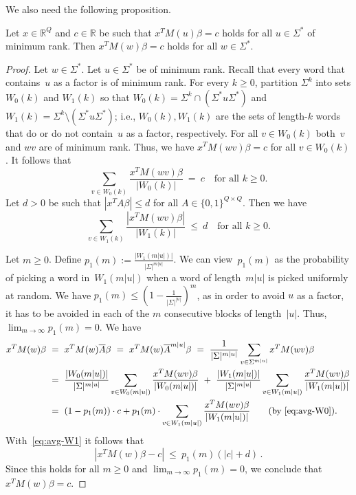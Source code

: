 \noindent
We also need the following proposition.

\begin{prop}\label{prop:compact}
Let $x \in \mathbb{R}^{Q}$ and $c \in \mathbb{R}$ be such that $x^T M(u) \beta = c$ holds for all $u \in \Sigma^*$ of minimum rank.
Then $x^T M(w) \beta = c$ holds for all $w \in \Sigma^*$.
\end{prop}

\begin{proof}
Let $w \in \Sigma^*$.
Let $u \in \Sigma^*$ be of minimum rank.
Recall that every word that contains~$u$ as a factor is of minimum rank.
For every $k \ge 0$, partition $\Sigma^k$ into sets $W_0(k)$ and $W_1(k)$ so that $W_0(k) = \Sigma^k \cap (\Sigma^* u \Sigma^*)$ and $W_1(k) = \Sigma^k \setminus (\Sigma^* u \Sigma^*)$; i.e., $W_0(k), W_1(k)$ are the sets of length-$k$ words that do or do not contain~$u$ as a factor, respectively.
For all $v \in W_0(k)$ both~$v$ and $w v$ are of minimum rank.
Thus, we have $x^T M(w v) \beta = c$ for all $v \in W_0(k)$.
It follows that
\begin{equation} \label{eq:avg-W0}
\sum_{v \in W_0(k)} \frac{x^T M(w v) \beta}{|W_0(k)|} \ = \ c \quad \text{for all $k \ge 0$.} 
\end{equation}
Let $d > 0$ be such that $|x^T A \beta| \le d$ for all $A \in \{0,1\}^{Q \times Q}$.
Then we have
\begin{equation} \label{eq:avg-W1}
\sum_{v \in W_1(k)} \frac{|x^T M(w v) \beta|}{|W_1(k)|} \ \le \ d \quad \text{for all $k \ge 0$.} 
\end{equation}

\noindent
Let $m \ge 0$.
Define $p_1(m) := \frac{|W_1(m |u|)|}{|\Sigma|^{m |u|}}$.
We can view~$p_1(m)$ as the probability of picking a word in~$W_1(m |u|)$ when a word of length~$m |u|$ is picked uniformly at random.
We have
$p_1(m) \le \left( 1 - \frac{1}{|\Sigma|^{|u|}} \right)^m$, as in order to avoid $u$ as a factor, it has to be avoided in each of the $m$ consecutive blocks of length~$|u|$.
Thus, $\lim_{m \to \infty} p_1(m) = 0$.
We have
\begin{align*}
x^T M(w) \beta
 \ &= \ x^T M(w) \overline{A} \beta \ = \ x^T M(w) \overline{A}^{m |u|} \beta \ = \ \frac{1}{|\Sigma|^{m |u|}} \sum_{v \in \Sigma^{m |u|}} x^T M(w v) \beta \\
 \ &= \ \frac{|W_0(m |u|)|}{|\Sigma|^{m |u|}} \sum_{v \in W_0(m |u|)} \frac{x^T M(w v) \beta}{|W_0(m |u|)|} \ + \ \frac{|W_1(m |u|)|}{|\Sigma|^{m |u|}} \sum_{v \in W_1(m |u|)} \frac{x^T M(w v) \beta}{|W_1(m |u|)|} \\
 \ &= \ (1-p_1(m)) \cdot c + p_1(m) \cdot \sum_{v \in W_1(m |u|)} \frac{x^T M(w v) \beta}{|W_1(m |u|)|} \qquad (\text{by \autoref{eq:avg-W0}).}
\end{align*}
With~\autoref{eq:avg-W1} it follows that
\[
 |x^T M(w) \beta - c| \ \le \ p_1(m) ( |c| + d)\,.
\]
Since this holds for all $m \ge 0$ and $\lim_{m \to \infty} p_1(m) = 0$, we conclude that $x^T M(w) \beta = c$.
\end{proof}

